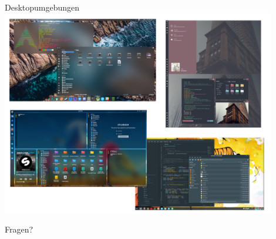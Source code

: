 \documentclass[10pt]{beamer}
\begin{document}
\begin{frame}{Desktopumgebungen}
\centering
\includegraphics[keepaspectratio,width=0.9\textwidth]{img/desktops.png}
\end{frame}

\begin{frame}[standout]
Fragen?
\end{frame}
\end{document}
